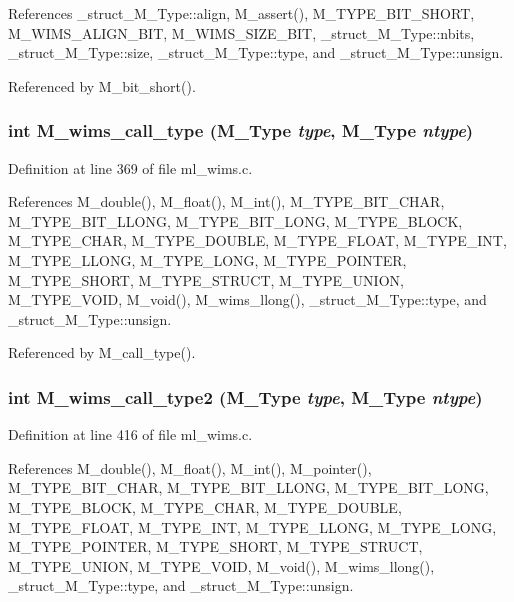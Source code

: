 References \_\-struct\_\-M\_\-Type::align, M\_\-assert(), M\_\-TYPE\_\-BIT\_\-SHORT, M\_\-WIMS\_\-ALIGN\_\-BIT, M\_\-WIMS\_\-SIZE\_\-BIT, \_\-struct\_\-M\_\-Type::nbits, \_\-struct\_\-M\_\-Type::size, \_\-struct\_\-M\_\-Type::type, and \_\-struct\_\-M\_\-Type::unsign.

Referenced by M\_\-bit\_\-short().
\subsubsection{\setlength{\rightskip}{0pt plus 5cm}int M\_\-wims\_\-call\_\-type (\bf{M\_\-Type} {\em type}, \bf{M\_\-Type} {\em ntype})}\label{ml__wims_8c_69f1561aed1b0887a159687d8a744c58}




Definition at line 369 of file ml\_\-wims.c.

References M\_\-double(), M\_\-float(), M\_\-int(), M\_\-TYPE\_\-BIT\_\-CHAR, M\_\-TYPE\_\-BIT\_\-LLONG, M\_\-TYPE\_\-BIT\_\-LONG, M\_\-TYPE\_\-BLOCK, M\_\-TYPE\_\-CHAR, M\_\-TYPE\_\-DOUBLE, M\_\-TYPE\_\-FLOAT, M\_\-TYPE\_\-INT, M\_\-TYPE\_\-LLONG, M\_\-TYPE\_\-LONG, M\_\-TYPE\_\-POINTER, M\_\-TYPE\_\-SHORT, M\_\-TYPE\_\-STRUCT, M\_\-TYPE\_\-UNION, M\_\-TYPE\_\-VOID, M\_\-void(), M\_\-wims\_\-llong(), \_\-struct\_\-M\_\-Type::type, and \_\-struct\_\-M\_\-Type::unsign.

Referenced by M\_\-call\_\-type().
\subsubsection{\setlength{\rightskip}{0pt plus 5cm}int M\_\-wims\_\-call\_\-type2 (\bf{M\_\-Type} {\em type}, \bf{M\_\-Type} {\em ntype})}\label{ml__wims_8c_f0f53b2aba589382fc3407ffcd8c585a}




Definition at line 416 of file ml\_\-wims.c.

References M\_\-double(), M\_\-float(), M\_\-int(), M\_\-pointer(), M\_\-TYPE\_\-BIT\_\-CHAR, M\_\-TYPE\_\-BIT\_\-LLONG, M\_\-TYPE\_\-BIT\_\-LONG, M\_\-TYPE\_\-BLOCK, M\_\-TYPE\_\-CHAR, M\_\-TYPE\_\-DOUBLE, M\_\-TYPE\_\-FLOAT, M\_\-TYPE\_\-INT, M\_\-TYPE\_\-LLONG, M\_\-TYPE\_\-LONG, M\_\-TYPE\_\-POINTER, M\_\-TYPE\_\-SHORT, M\_\-TYPE\_\-STRUCT, M\_\-TYPE\_\-UNION, M\_\-TYPE\_\-VOID, M\_\-void(), M\_\-wims\_\-llong(), \_\-struct\_\-M\_\-Type::type, and \_\-struct\_\-M\_\-Type::unsign.

